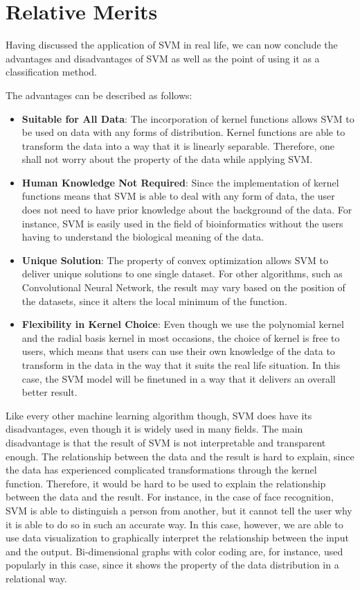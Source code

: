 \section{Relative Merits}
Having discussed the application of SVM in real life, we can now conclude
the advantages and disadvantages of SVM as well as the point of using it 
as a classification method. 

The advantages can be described as follows:
\begin{itemize}
    \item \textbf{Suitable for All Data}: The incorporation of kernel functions
    allows SVM to be used on data with any forms of distribution. Kernel functions
    are able to transform the data into a way that it is linearly separable. Therefore,
    one shall not worry about the property of the data while applying SVM.
    \item \textbf{Human Knowledge Not Required}: Since the implementation of kernel functions
    means that SVM is able to deal with any form of data, the user does not need to 
    have prior knowledge about the background of the data. For instance, SVM is easily
    used in the field of bioinformatics without the users having to understand the 
    biological meaning of the data.
    \item \textbf{Unique Solution}: The property of convex optimization allows SVM
    to deliver unique solutions to one single dataset. For other algorithms, 
    such as Convolutional Neural Network, the result may vary based on the position of
    the datasets, since it alters the local minimum of the function.
    \item \textbf{Flexibility in Kernel Choice}: Even though we use the polynomial
    kernel and the radial basis kernel in most occasions, the choice of kernel is
    free to users, which means that users can use their own knowledge of the data
    to transform in the data in the way that it suits the real life situation. In this
    case, the SVM model will be finetuned in a way that it delivers an overall better
    result.
\end{itemize}

Like every other machine learning algorithm though,
SVM does have its disadvantages, even though it is widely used in many
fields. The main disadvantage is that the result of SVM is not 
interpretable and transparent enough. The relationship between the data
and the result is hard to explain, since the data has experienced 
complicated transformations through the kernel function.
Therefore, it would be hard to be used to explain
the relationship between the data and the result. For instance,
in the case of face recognition, SVM is able to distinguish
a person from another, but it cannot tell the user why it is
able to do so in such an accurate way. In this case, however, 
we are able to use data visualization to graphically interpret the relationship
between the input and the output. Bi-dimensional graphs with color coding are, 
for instance, used popularly in this case, since it shows the property of
the data distribution in a relational way. 
\cite{procon}
